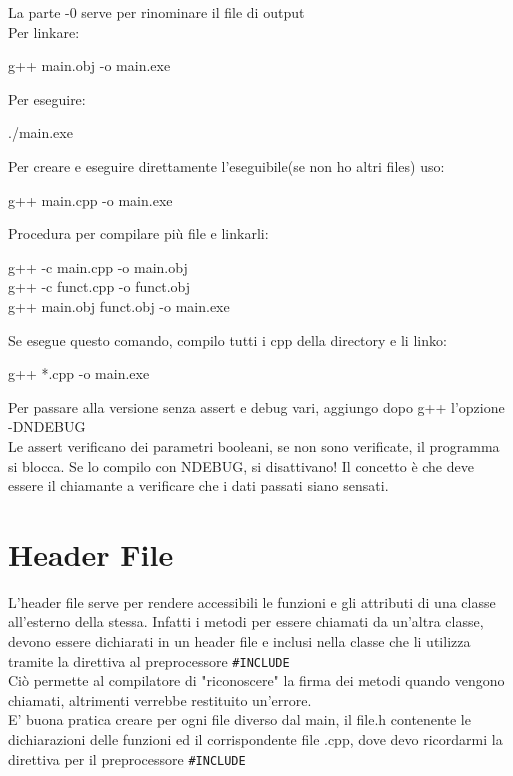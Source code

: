 La parte -0 serve per rinominare il file di output\\
Per linkare:

\begin{tcolorbox}
g++ main.obj -o main.exe
\end{tcolorbox}

Per eseguire: 

\begin{tcolorbox}
./main.exe
\end{tcolorbox}

Per creare e eseguire direttamente l'eseguibile(se non ho altri files) uso:\\

\begin{tcolorbox}
g++ main.cpp -o main.exe
\end{tcolorbox}

Procedura per compilare più file e linkarli:\\

\begin{tcolorbox}
g++ -c main.cpp -o main.obj\\
g++ -c funct.cpp -o funct.obj\\
g++ main.obj funct.obj -o main.exe\\
\end{tcolorbox}

Se esegue questo comando, compilo tutti i cpp della directory e li linko:

\begin{tcolorbox}
g++ *.cpp -o main.exe
\end{tcolorbox}

Per passare alla versione senza assert e debug vari, aggiungo dopo g++ l'opzione -DNDEBUG\\
Le assert verificano dei parametri booleani, se non sono verificate, il programma si blocca. Se lo compilo con NDEBUG, si disattivano! Il concetto è che deve essere il chiamante a verificare che i dati passati siano sensati.

\section{Header File}
L'header file serve per rendere accessibili le funzioni e gli attributi di una classe all'esterno della stessa. Infatti i metodi per essere chiamati da un'altra classe, devono essere dichiarati in un header file e inclusi nella classe che li utilizza tramite la direttiva al preprocessore \verb|#INCLUDE| \\
Ciò permette al compilatore di "riconoscere" la firma dei metodi quando vengono chiamati, altrimenti verrebbe restituito un'errore.\\
E' buona pratica creare per ogni file diverso dal main, il file.h contenente le dichiarazioni delle funzioni ed il corrispondente file .cpp, dove devo ricordarmi la direttiva per il preprocessore \verb|#INCLUDE| \\

